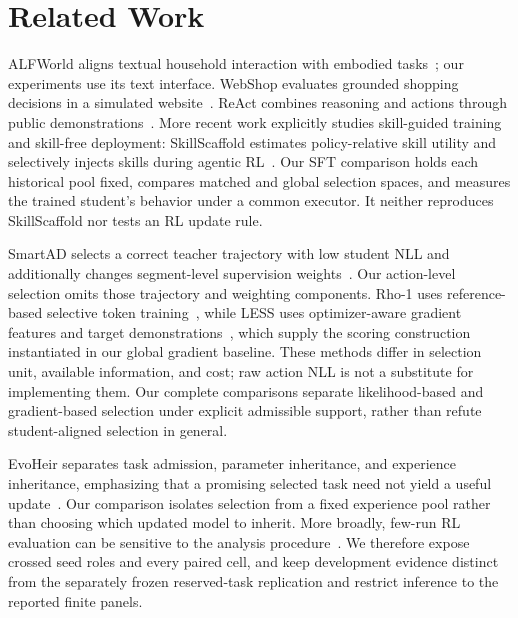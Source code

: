 \section{Related Work}
\label{sec:related}
ALFWorld aligns textual household interaction with embodied tasks~\citep{shridhar2021alfworld}; our experiments use its text interface. WebShop evaluates grounded shopping decisions in a simulated website~\citep{yao2022webshop}. ReAct combines reasoning and actions through public demonstrations~\citep{yao2023react}. More recent work explicitly studies skill-guided training and skill-free deployment: SkillScaffold estimates policy-relative skill utility and selectively injects skills during agentic RL~\citep{zhong2026skillscaffold}. Our SFT comparison holds each historical pool fixed, compares matched and global selection spaces, and measures the trained student's behavior under a common executor. It neither reproduces SkillScaffold nor tests an RL update rule.

SmartAD selects a correct teacher trajectory with low student NLL and additionally changes segment-level supervision weights~\citep{tang2026smartad}. Our action-level selection omits those trajectory and weighting components. Rho-1 uses reference-based selective token training~\citep{lin2024rho}, while LESS uses optimizer-aware gradient features and target demonstrations~\citep{xia2024less}, which supply the scoring construction instantiated in our global gradient baseline. These methods differ in selection unit, available information, and cost; raw action NLL is not a substitute for implementing them. Our complete comparisons separate likelihood-based and gradient-based selection under explicit admissible support, rather than refute student-aligned selection in general.

EvoHeir separates task admission, parameter inheritance, and experience inheritance, emphasizing that a promising selected task need not yield a useful update~\citep{yang2026evoheir}. Our comparison isolates selection from a fixed experience pool rather than choosing which updated model to inherit. More broadly, few-run RL evaluation can be sensitive to the analysis procedure~\citep{agarwal2021precipice}. We therefore expose crossed seed roles and every paired cell, and keep development evidence distinct from the separately frozen reserved-task replication and restrict inference to the reported finite panels.
